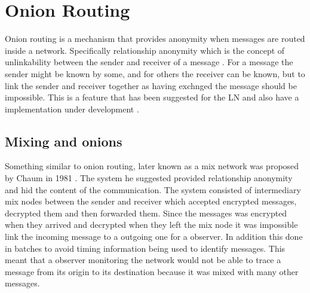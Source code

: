 \documentclass[informationsecurity]{gucmasterproject}
\begin{document}
\chapter{Onion Routing}

Onion routing is a mechanism that provides anonymity when messages are routed inside a network. 
Specifically relationship anonymity which is the concept of unlinkability between the sender and receiver of a message \cite{pfitzmann2001anonymity}. For a message the sender might be known by some, and for others the receiver can be known, but to link the sender and receiver together as having exchnged the message should be impossible. This is a feature that has been suggested for the LN \cite{LNDM_onion}\cite{SB_onion} and also have a implementation under development \cite{LN_onion_implementation}.

\section{Mixing and onions}

Something similar to onion routing, later known as a mix network was proposed by Chaum in 1981 \cite{chaum1981untraceable}.
The system he suggested provided relationship anonymity and hid the content of the communication. The system consisted of intermediary mix nodes between the sender and receiver which accepted encrypted messages, decrypted them and then forwarded them. Since the messages was encrypted when they arrived and decrypted when they left the mix node it was impossible link the incoming message to a outgoing one for a observer. In addition this done in batches to avoid timing information being used to identify messages. This meant that a observer monitoring the network would not be able to trace a message from its origin to its destination because it was mixed with many other messages.
\end{document}
